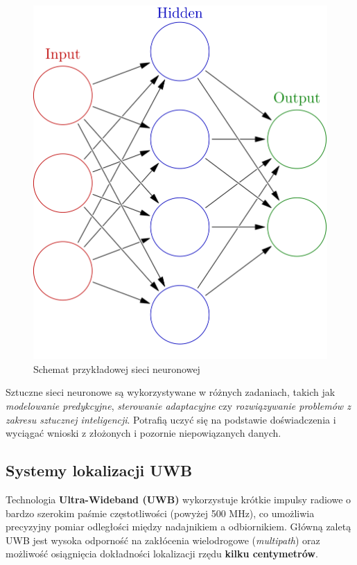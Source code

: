 \documentclass{classrep}
\begin{document}
\begin{figure}[h!]
	\centering
	\includegraphics[scale=0.2]{nn.png}
	\caption{Schemat przykładowej sieci neuronowej}
	\label{fig:nn}
\end{figure}

Sztuczne sieci neuronowe są wykorzystywane w różnych zadaniach, takich jak \textit{modelowanie predykcyjne}, \textit{sterowanie adaptacyjne} czy \textit{rozwiązywanie problemów z zakresu sztucznej inteligencji}. Potrafią uczyć się na podstawie doświadczenia i wyciągać wnioski z złożonych i pozornie niepowiązanych danych.
\clearpage{}
\subsection{Systemy lokalizacji UWB}
Technologia \textbf{Ultra-Wideband (UWB)} wykorzystuje krótkie impulsy radiowe o bardzo szerokim paśmie częstotliwości (powyżej 500 MHz), co umożliwia precyzyjny pomiar odległości między nadajnikiem a odbiornikiem. Główną zaletą UWB jest wysoka odporność na zakłócenia wielodrogowe (\textit{multipath}) oraz możliwość osiągnięcia dokładności lokalizacji rzędu \textbf{kilku centymetrów}.
\end{document}
